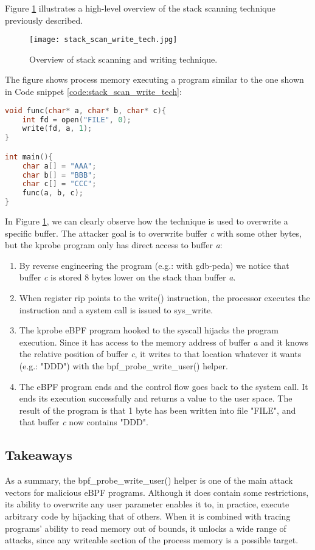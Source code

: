 Figure \ref{fig:stack_scan_write_tech} illustrates a high-level overview of the stack scanning technique previously described.
\begin{figure}[H]
	\centering
	\texttt{[image: stack\_scan\_write\_tech.jpg]}
	\caption{Overview of stack scanning and writing technique.}
	\label{fig:stack_scan_write_tech}
\end{figure}

The figure shows process memory executing a program similar to the one shown in Code snippet \ref{code:stack_scan_write_tech}:
\begin{lstlisting}[language=C, caption={Sample program being executed on figure \ref{fig:stack_scan_write_tech}.}, label={code:stack_scan_write_tech}]
void func(char* a, char* b, char* c){
	int fd = open("FILE", 0);
	write(fd, a, 1);
}

int main(){
	char a[] = "AAA";
	char b[] = "BBB";
	char c[] = "CCC";
	func(a, b, c);
}
\end{lstlisting}

In Figure \ref{fig:stack_scan_write_tech}, we can clearly observe how the technique is used to overwrite a specific buffer. The attacker goal is to overwrite buffer \textit{c} with some other bytes, but the kprobe program only has direct access to buffer \textit{a}:
\begin{enumerate}
\item By reverse engineering the program (e.g.: with gdb-peda) we notice that buffer \textit{c} is stored 8 bytes lower on the stack than buffer \textit{a}.
\item When register rip points to the write() instruction, the processor executes the instruction and a system call is issued to sys\_write.
\item The kprobe eBPF program hooked to the syscall hijacks the program execution. Since it has access to the memory address of buffer \textit{a} and it knows the relative position of buffer \textit{c}, it writes to that location whatever it wants (e.g.: "DDD") with the bpf\_probe\_write\_user() helper.
\item The eBPF program ends and the control flow goes back to the system call. It ends its execution successfully and returns a value to the user space. The result of the program is that 1 byte has been written into file "FILE", and that buffer \textit{c} now contains "DDD".
\end{enumerate}

\subsection{Takeaways}
As a summary, the bpf\_probe\_write\_user() helper is one of the main attack vectors for malicious eBPF programs. Although it does contain some restrictions, its ability to overwrite any user parameter enables it to, in practice, execute arbitrary code by hijacking that of others. When it is combined with tracing programs' ability to read memory out of bounds, it unlocks a wide range of attacks, since any writeable section of the process memory is a possible target. 

